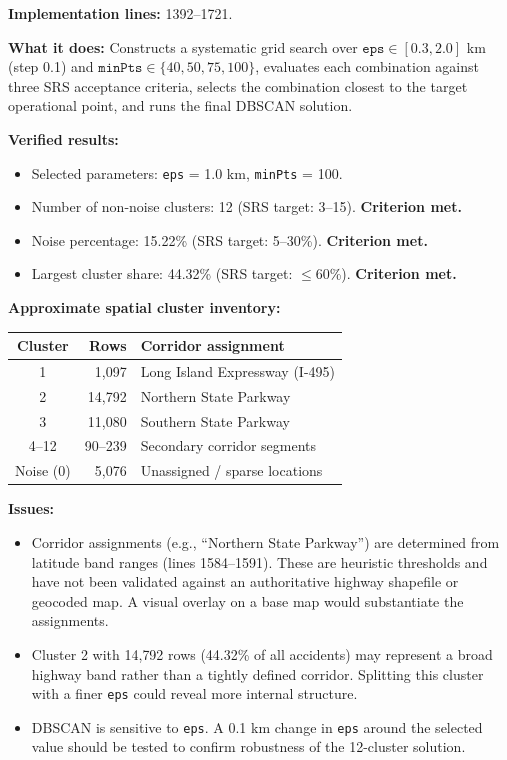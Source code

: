 \documentclass[11pt]{article}
\begin{document}
\textbf{Implementation lines:} 1392--1721.

\textbf{What it does:} Constructs a systematic grid search over
$\texttt{eps} \in [0.3, 2.0]$ km (step 0.1) and
$\texttt{minPts} \in \{40, 50, 75, 100\}$, evaluates each combination
against three SRS acceptance criteria, selects the combination closest to
the target operational point, and runs the final DBSCAN solution.

\textbf{Verified results:}
\begin{itemize}
\item Selected parameters: \texttt{eps} = 1.0 km, \texttt{minPts} = 100.
\item Number of non-noise clusters: 12 (SRS target: 3--15). \textbf{Criterion met.}
\item Noise percentage: 15.22\% (SRS target: 5--30\%). \textbf{Criterion met.}
\item Largest cluster share: 44.32\% (SRS target: $\leq 60$\%). \textbf{Criterion met.}
\end{itemize}

\textbf{Approximate spatial cluster inventory:}

\begin{center}
\begin{tabular}{|c|r|l|}
\hline
Cluster & Rows & Corridor assignment \\
\hline
1 & 1{,}097 & Long Island Expressway (I-495) \\
2 & 14{,}792 & Northern State Parkway \\
3 & 11{,}080 & Southern State Parkway \\
4--12 & 90--239 & Secondary corridor segments \\
Noise (0) & 5{,}076 & Unassigned / sparse locations \\
\hline
\end{tabular}
\end{center}

\textbf{Issues:}
\begin{itemize}
\item Corridor assignments (e.g., ``Northern State Parkway'') are determined from
  latitude band ranges (lines 1584--1591). These are heuristic thresholds and
  have not been validated against an authoritative highway shapefile or geocoded
  map. A visual overlay on a base map would substantiate the assignments.
\item Cluster 2 with 14{,}792 rows (44.32\% of all accidents) may represent a
  broad highway band rather than a tightly defined corridor. Splitting this
  cluster with a finer \texttt{eps} could reveal more internal structure.
\item DBSCAN is sensitive to \texttt{eps}. A 0.1 km change in \texttt{eps}
  around the selected value should be tested to confirm robustness of the
  12-cluster solution.
\end{itemize}
\end{document}
